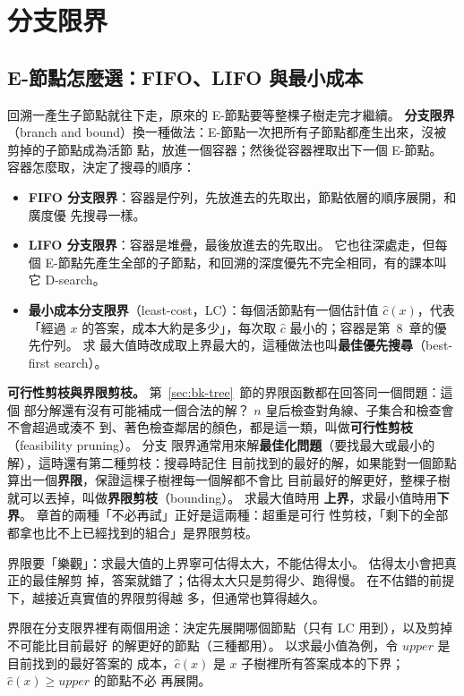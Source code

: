 \section{分支限界}
\label{sec:bk-bb}

\subsection{E-節點怎麼選：FIFO、LIFO 與最小成本}

回溯一產生子節點就往下走，原來的 E-節點要等整棵子樹走完才繼續。 \textbf{分支限界}
（branch and bound）換一種做法：E-節點一次把所有子節點都產生出來，沒被剪掉的子節點成為活節
點，放進一個容器；然後從容器裡取出下一個 E-節點。 容器怎麼取，決定了搜尋的順序：

\begin{itemize}
\item \textbf{FIFO 分支限界}：容器是佇列，先放進去的先取出，節點依層的順序展開，和廣度優
先搜尋一樣。
\item \textbf{LIFO 分支限界}：容器是堆疊，最後放進去的先取出。 它也往深處走，但每個
E-節點先產生全部的子節點，和回溯的深度優先不完全相同，有的課本叫它 D-search。
\item \textbf{最小成本分支限界}（least-cost，LC）：每個活節點有一個估計值 $\hat c(x)$，代表
「經過 $x$ 的答案，成本大約是多少」，每次取 $\hat c$ 最小的；容器是第~8~章的優先佇列。 求
最大值時改成取上界最大的，這種做法也叫\textbf{最佳優先搜尋}（best-first search）。
\end{itemize}

\textbf{可行性剪枝與界限剪枝。} 第~\ref{sec:bk-tree}~節的界限函數都在回答同一個問題：這個
部分解還有沒有可能補成一個合法的解？ $n$ 皇后檢查對角線、子集合和檢查會不會超過或湊不
到、著色檢查鄰居的顏色，都是這一類，叫做\textbf{可行性剪枝}（feasibility pruning）。 分支
限界通常用來解\textbf{最佳化問題}（要找最大或最小的解），這時還有第二種剪枝：搜尋時記住
目前找到的最好的解，如果能對一個節點算出一個\textbf{界限}，保證這棵子樹裡每一個解都不會比
目前最好的解更好，整棵子樹就可以丟掉，叫做\textbf{界限剪枝}（bounding）。 求最大值時用
\textbf{上界}，求最小值時用\textbf{下界}。 章首的兩種「不必再試」正好是這兩種：超重是可行
性剪枝，「剩下的全部都拿也比不上已經找到的組合」是界限剪枝。

界限要「樂觀」：求最大值的上界寧可估得太大，不能估得太小。 估得太小會把真正的最佳解剪
掉，答案就錯了；估得太大只是剪得少、跑得慢。 在不估錯的前提下，越接近真實值的界限剪得越
多，但通常也算得越久。

界限在分支限界裡有兩個用途：決定先展開哪個節點（只有 LC 用到），以及剪掉不可能比目前最好
的解更好的節點（三種都用）。 以求最小值為例，令 $\mathit{upper}$ 是目前找到的最好答案的
成本，$\hat c(x)$ 是 $x$ 子樹裡所有答案成本的下界；$\hat c(x) \ge \mathit{upper}$ 的節點不必
再展開。

